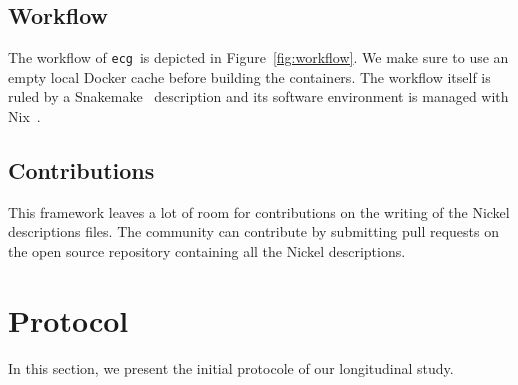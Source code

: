 \documentclass[sigconf,natbib=false]{acmart}
\newcommand{\df}{\texttt{Dockerfile}}
\newcommand{\ecg}{\texttt{ecg}}
\begin{document}
\subsection{Workflow}\label{sec:workflow}

\begin{figure*}
  \centering
  \caption{
    Workflow of \ecg.
    Each description of an artifact is verified with the Nickel contract and then converted in a JSON representation.
    This JSON representation is then read by \ecg\ to
    \textit{(i)} download the artifact,
    \textit{(ii)} compute the hash of its content,
    \textit{(iii)} build the container from the \df, and
    \textit{(iv)} extract the software environment information from the built container.
    \ecg\ outputs files containing the information about the artifact and its \df\ .
  }
  \label{fig:workflow}
\end{figure*}

The workflow of \ecg\ is depicted in Figure~\ref{fig:workflow}.
We make sure to use an empty local Docker cache before building the containers.
The workflow itself is ruled by a Snakemake~\cite{koster2012snakemake} description and its software environment is managed with Nix~\cite{dolstra_nix_2004}.

\subsection{Contributions}

This framework leaves a lot of room for contributions on the writing of the Nickel descriptions files.
The community can contribute by submitting pull requests on the open source repository containing all the Nickel descriptions.

\section{Protocol}\label{sec:protocol}

In this section, we present the initial protocole of our longitudinal study.
\end{document}
